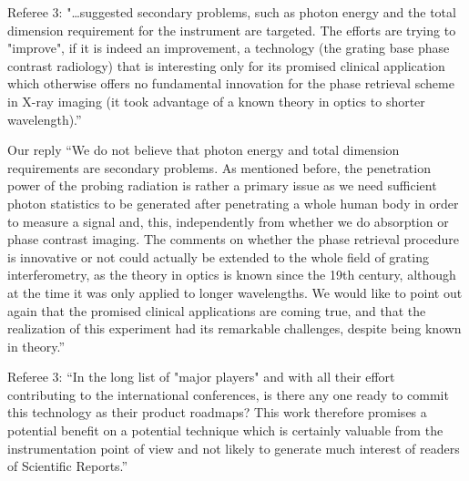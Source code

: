 \documentclass[a4paper,english]{scrartcl} \usepackage[detect-all]{siunitx}
\begin{document}
Referee 3: "…suggested secondary problems, such as photon energy and the
total dimension requirement for the instrument are targeted. The efforts are
trying to "improve", if it is indeed an improvement, a technology (the
grating base phase contrast radiology) that is interesting only for its
promised clinical application which otherwise offers no fundamental
innovation for the phase retrieval scheme in X-ray imaging (it took
advantage of a known theory in optics to shorter wavelength).”

Our reply “We do not believe that photon energy and total dimension
requirements are secondary problems. As mentioned before, the penetration
power of the probing radiation is rather a primary issue as we need
sufficient photon statistics to be generated after penetrating a whole human
body in order to measure a signal and, this, independently from whether we
do absorption or phase contrast imaging. The comments on whether the phase
retrieval procedure is innovative or not could actually be extended to the
whole field of grating interferometry, as the theory in optics is known
since the 19th century, although at the time it was only applied to longer
wavelengths. We would like to point out again that the promised clinical
applications are coming true, and that the realization of this experiment
had its remarkable challenges, despite being known in theory.”

Referee 3: “In the long list of "major players" and with all their effort
contributing to the international conferences, is there any one ready to
commit this technology as their product roadmaps? This work therefore
promises a potential benefit on a potential technique which is certainly
valuable from the instrumentation point of view and not likely to generate
much interest of readers of Scientific Reports.”
\end{document}
